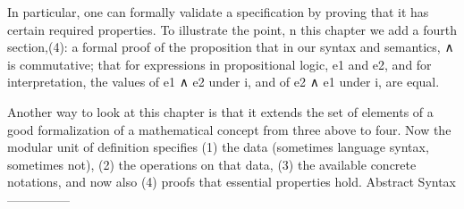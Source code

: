 \documentclass[letterpaper,10pt,english]{sphinxmanual}
\begin{document}
\sphinxAtStartPar
In particular, one can formally validate a specification by
proving that it has certain required properties. To illustrate
the point, n this chapter we add a fourth section,(4): a formal
proof of the proposition that in our syntax and semantics, ∧ is
commutative; that for  expressions in propositional logic,
e1 and e2, and for  interpretation, the values of e1 ∧ e2
under i, and of e2 ∧ e1 under i, are equal.

\sphinxAtStartPar
Another way to look at this chapter is that it extends the set of
elements of a good formalization of a mathematical concept from
three above to four. Now the modular unit of definition specifies
(1) the data (sometimes language syntax, sometimes not), (2) the
operations on that data, (3) the available concrete notations,
and now also (4) proofs that essential properties hold.
Abstract Syntax
—————

\begin{sphinxVerbatim}[commandchars=\\\{\}]
 

   
    

 
 

 
 
 
 
 
 

 
 

   
                             
                         
                          
         

 
\end{sphinxVerbatim}
\end{document}
